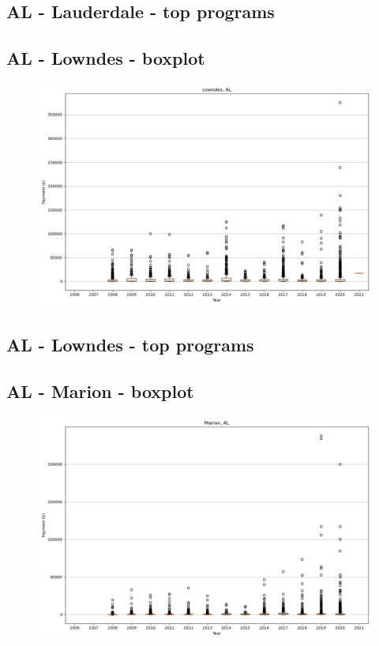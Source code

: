 \subsection*{AL - Lauderdale - top programs}

\newpage
\subsection*{AL - Lowndes - boxplot}
\begin{figure}[h]
\centering
\includegraphics[width=7in]{../output/boxplots/counties/Lowndes-AL_boxplot.png}
\end{figure}


\subsection*{AL - Lowndes - top programs}

\newpage
\subsection*{AL - Marion - boxplot}
\begin{figure}[h]
\centering
\includegraphics[width=7in]{../output/boxplots/counties/Marion-AL_boxplot.png}
\end{figure}


